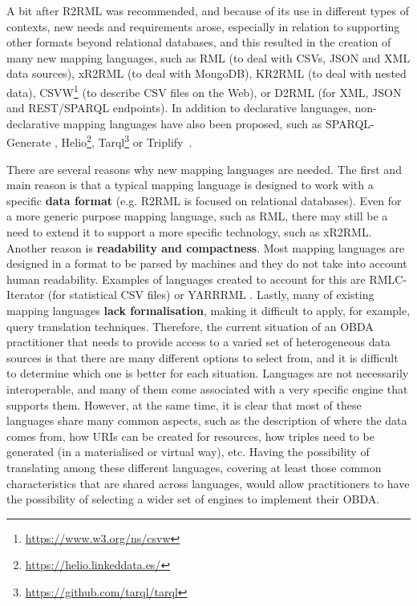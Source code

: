 A bit after R2RML was recommended, and because of its use in different types of contexts, new needs and requirements arose, especially in relation to supporting other formats beyond relational databases, and this resulted in the creation of many new mapping languages, such as RML \citep{dimou2014rml} (to deal with CSVs, JSON and XML data sources), xR2RML \citep{michel2015translation} (to deal with MongoDB), KR2RML \citep{slepicka2015kr2rml} (to deal with nested data), CSVW\footnote{\url{https://www.w3.org/ns/csvw}} (to describe CSV files on the Web), or D2RML \citep{chortaras2018d2rml} (for XML, JSON and REST/SPARQL endpoints). In addition to declarative languages, non-declarative mapping languages have also been proposed, such as SPARQL-Generate \citep{lefranccois2017sparql}, Helio\footnote{\url{https://helio.linkeddata.es/}},  Tarql\footnote{\url{https://github.com/tarql/tarql}} or Triplify~\citep{auer2009triplify}.

There are several reasons why new mapping languages are needed. The first and main reason is that a typical mapping language is designed to work with a specific \textbf{data format} (e.g. R2RML is focused on relational databases). Even for a more generic purpose mapping language, such as RML, there may still be a need to extend it to support a more specific technology, such as xR2RML. Another reason is \textbf{readability and compactness}. Most mapping languages are designed in a format to be parsed by machines and they do not take into account human readability. Examples of languages created to account for this are RMLC-Iterator (for statistical CSV files) \citep{chaves2018virtual} or YARRRML \citep{Heyvaert2018Declarative}. Lastly, many of existing mapping languages \textbf{lack formalisation}, making it difficult to apply, for example, query translation techniques. 
Therefore, the current situation of an OBDA practitioner that needs to provide access to a varied set of heterogeneous data sources is that there are many different options to select from, and it is difficult to determine which one is better for each situation. Languages are not necessarily interoperable, and many of them come associated with a very specific engine that supports them. However, at the same time, it is clear that most of these languages share many common aspects, such as the description of where the data comes from, how URIs can be created for resources, how triples need to be generated (in a materialised or virtual way), etc. Having the possibility of translating among these different languages, covering at least those common characteristics that are shared across languages, would allow practitioners to have the possibility of selecting a wider set of engines to implement their OBDA.


